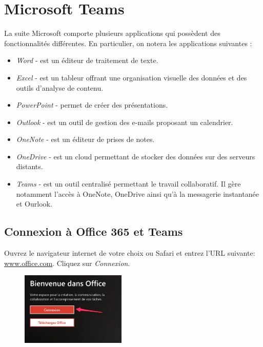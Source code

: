 \chapter{Microsoft Teams}\label{teams1}  


La suite Microsoft comporte plusieurs applications qui possèdent des fonctionnalités différentes. En particulier, on notera les applications suivantes :\\


\begin{itemize}
\item \textit{Word} - est un éditeur de traitement de texte.
\item \textit{Excel} - est un tableur offrant une organisation visuelle des données et des outils d'analyse de contenu.
\item \textit{PowerPoint} - permet de créer des présentations.
\item \textit{Outlook} - est un outil de gestion des e-mails proposant un calendrier.
\item \textit{OneNote} - est un éditeur de prises de notes.
\item \textit{OneDrive} - est un cloud permettant de stocker des données sur des serveurs distants.
\item \textit{Teams} - est un outil centralisé permettant le travail collaboratif. Il gère notamment l'accès à OneNote, OneDrive ainsi qu'à la messagerie instantanée et Ourlook.
\end{itemize} 



\section{Connexion à Office 365 et Teams}

Ouvrez le navigateur internet de votre choix ou Safari et entrez l'URL suivante: \url{www.office.com}. Cliquez sur \textit{Connexion}.

\begin{figure}[H]
\includegraphics[width=5cm]{./images/teams/ecran_office_com_crop}
\centering
\end{figure}


